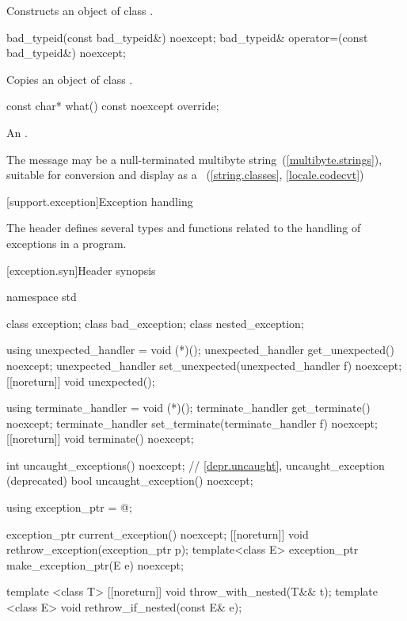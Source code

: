 \begin{itemdescr}
\pnum
\effects
Constructs an object of class
.
\end{itemdescr}

%
%
\begin{itemdecl}
bad_typeid(const bad_typeid&) noexcept;
bad_typeid& operator=(const bad_typeid&) noexcept;
\end{itemdecl}

\begin{itemdescr}
\pnum
\effects
Copies an object of class
.
\end{itemdescr}

%
%
\begin{itemdecl}
const char* what() const noexcept override;
\end{itemdecl}

\begin{itemdescr}
\pnum
\returns
An  \ntbs.

\pnum
\remarks
The message may be a null-terminated multibyte string~(\ref{multibyte.strings}),
suitable for conversion and display as a
~(\ref{string.classes}, \ref{locale.codecvt})
\end{itemdescr}

[support.exception]{Exception handling}

\pnum
The header
defines several types and functions related to the handling of exceptions in a \Cpp program.

[exception.syn]{Header  synopsis}
%
%

\begin{codeblock}
namespace std {
  class exception;
  class bad_exception;
  class nested_exception;

  using unexpected_handler = void (*)();
  unexpected_handler get_unexpected() noexcept;
  unexpected_handler set_unexpected(unexpected_handler f) noexcept;
  [[noreturn]] void unexpected();

  using terminate_handler = void (*)();
  terminate_handler get_terminate() noexcept;
  terminate_handler set_terminate(terminate_handler f) noexcept;
  [[noreturn]] void terminate() noexcept;

  int uncaught_exceptions() noexcept;
  // \ref{depr.uncaught}, uncaught_exception (deprecated)
  bool uncaught_exception() noexcept;

  using exception_ptr = @\unspec@;

  exception_ptr current_exception() noexcept;
  [[noreturn]] void rethrow_exception(exception_ptr p);
  template<class E> exception_ptr make_exception_ptr(E e) noexcept;

  template <class T> [[noreturn]] void throw_with_nested(T&& t);
  template <class E> void rethrow_if_nested(const E& e);
}
\end{codeblock}

